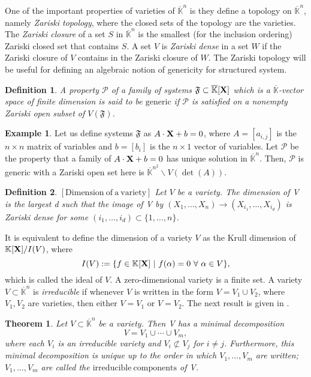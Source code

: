 \documentclass[11pt]{article}
\numberwithin{Property}{section}
\newtheorem{Theorem}{Theorem}%
\numberwithin{Theorem}{section}
\numberwithin{Proposition}{section}
\numberwithin{Lemma}{section}
\numberwithin{Corollary}{section}
\newtheorem{Definition}{Definition}%
\numberwithin{Definition}{section}
\numberwithin{Remark}{section}
\numberwithin{Conjecture}{section}
\numberwithin{Problem}{section}
\numberwithin{Claim}{section}
\theoremstyle{definition}
\newtheorem{Example}{Example}%
\numberwithin{Example}{section}
\def\bar{\overline}
\newcommand{\field}{\mathbb{K}} %
\newcommand{\mat}[1]{\mathbf{\MakeUppercase{#1}}} %
\begin{document}
One of the important properties of varieties of $\bar{\field}^n$ is they define a topology on $\bar{\field}^n$, namely \emph{Zariski topology}, where the closed sets of the topology are the varieties. The \emph{Zariski closure} of a set $S$ in $\bar{\field}^n$ is the smallest (for the inclusion ordering) Zariski closed set that contains $S$. A set $V$ is \emph{Zariski dense} in a set $W$ if the Zariski closure of $V$ contains in the Zariski closure of $W$. The Zariski topology will be useful for defining an algebraic notion of genericity for structured system. 
\begin{Definition} A property $\mathscr{P}$ of a family of systems $\mathfrak{F} \subset \bar{\field}[\mat{X}]$ which is a $\bar{\field}$-vector space of finite dimension is said to be $\mathrm{generic}$ if $\mathscr{P}$ is satisfied on a nonempty Zariski open subset of $V(\mathfrak{F})$.
\end{Definition}
\begin{Example} Let us define systems $\mathfrak{F}$ as $A\cdot \mat{X} + b = 0$, where $A = [a_{i,j}]$ is the $n \times n$ matrix of variables and $b = [b_i]$ is the $n \times 1$ vector of variables. Let $\mathscr{P}$ be the property that a family of $A\cdot \mat{X} + b = 0$ has unique solution in $\bar{\field}^n$. Then, $\mathscr{P}$ is generic with a Zariski open set here is $\bar{\field}^{n^2} \backslash V(\det(A))$.
\end{Example}
\begin{Definition}$\mathrm{[Dimension \ of \ a \ variety]}$ Let $V$ be a variety. The dimension of V is the largest d such that the image of V by $(X_1, \ldots, X_n) \to (X_{i_1}, \ldots, X_{i_d})$ is Zariski dense for some $(i_1, \ldots, i_d) \subset \{1, \ldots, n\}$.
\end{Definition}
It is equivalent to define the dimension of a variety $V$ as the Krull dimension of $\field[\mat{X}]/I(V)$, where \[I(V) := \{f \in \field[\mat{X}] \ | \ f(\alpha) = 0 \ \forall \ \alpha \in V\},\]
 which is called the ideal of $V$. A zero-dimensional variety is a finite set. A variety $V \subset \bar{\field}^n$ is \emph{irreducible} if whenever $V$ is written in the form $V = V_1 \cup V_2$, where $V_1, V_2$ are varieties, then either $V = V_1$ or $V = V_2$. The next result is given in \cite[Theorem~4 -- section~6 -- chapter~4]{Cox07}.
\begin{Theorem} Let $V \subset \bar{\field}^{n}$ be a variety. Then V has a minimal decomposition 
\[
V = V_1 \cup \cdots \cup V_m,
\] where each $V_i$ is an irreducible variety and $V_i \not\subset V_j$ for $i \ne j$. Furthermore, this minimal decomposition is unique up to the order in which $V_1, \ldots, V_m$ are written; $V_1, \ldots, V_m$ are called the $\mathrm{irreducible \ components}$ of V.
\end{Theorem}
\end{document}
